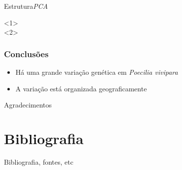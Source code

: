 \documentclass{beamer}
\begin{document}
\begin{frame}{ Estrutura}{\textit{PCA}}

    \centering
      <1>\\

      <2>\\

    \end{frame}

\begin{frame}
  \frametitle{Conclusões}

  \begin{itemize}[<+->]
\item Há uma grande varia\c{c}ão  genética em \textit{Poecilia vivipara}
\item A varia\c{c}ão está organizada geograficamente
\end{itemize}

 

\end{frame}



\begin{frame}{Agradecimentos}
  \centering

\end{frame}

\section*{Bibliografia}
\begin{frame}{Bibliografia, fontes, etc}
 \centering
\end{frame}
\end{document}
